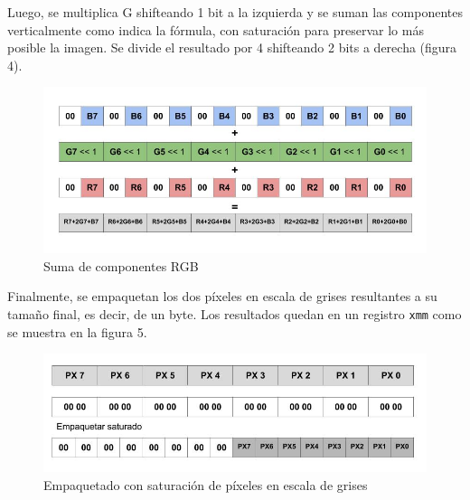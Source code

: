 \documentclass[a4paper]{article}
\begin{document}
Luego, se multiplica G shifteando 1 bit a la izquierda y se suman las componentes verticalmente como indica la fórmula, con saturación para preservar lo más posible la imagen. Se divide el resultado por 4 shifteando 2 bits a derecha (figura 4).

\begin{figure}[h]
  \begin{center}
	\includegraphics[scale=0.4]{img/ocultar/SumaVerticalGrayscale.jpg}
	\caption{Suma de componentes RGB}
  \end{center}
\end{figure}

Finalmente, se empaquetan los dos píxeles en escala de grises resultantes a su tamaño final, es decir, de un byte. Los resultados quedan en un registro {\tt xmm} como se muestra en la figura 5.

\begin{figure}[h]
  \begin{center}
	\includegraphics[scale=0.4]{img/ocultar/EmpaquetarSaturadoGrayscale.jpg}
	\caption{Empaquetado con saturación de píxeles en escala de grises}
  \end{center}
\end{figure}

\pagebreak
\end{document}
